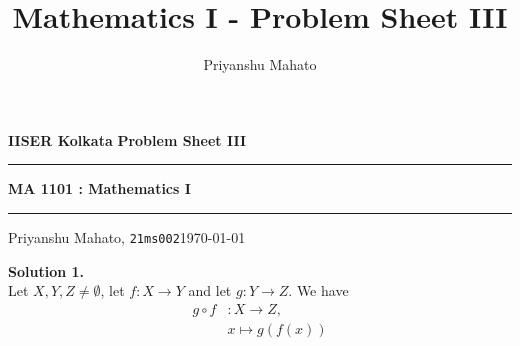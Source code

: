 \documentclass[10pt]{article}
\title{Mathematics I - Problem Sheet III}
\author{Priyanshu Mahato}
\date{}
\begin{document}
	\par\textbf{IISER Kolkata} \hfill \textbf{Problem Sheet III}
	\vspace{3pt}
	\hrule
	\vspace{3pt}
	\begin{center}
		\LARGE{\textbf{MA 1101 : Mathematics I}}
	\end{center}
	\vspace{3pt}
	\hrule
	\vspace{3pt}
	Priyanshu Mahato, \texttt{21ms002}\hfill\today
	\vspace{20pt}
	
	\textbf{Solution 1.}\\
	Let $X, Y, Z \neq \emptyset$, let $ f : X \to Y $ and let $ g : Y \to Z $.
	We have
	\begin{align*}
		g\circ f &: X \to Z, \\
		&x \mapsto  g(f(x))
	\end{align*}
\end{document}
